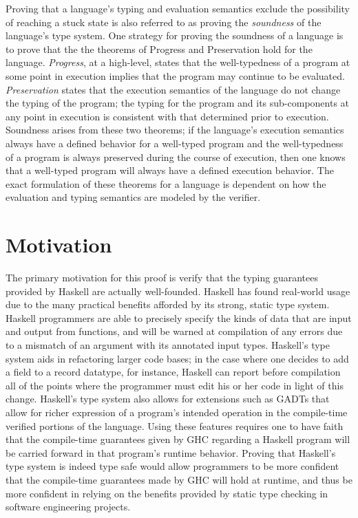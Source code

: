\documentclass{sig-alternate}
\begin{document}
Proving that a language's typing and evaluation semantics exclude the possibility of reaching a stuck state is also referred to as proving the {\em soundness} of the language's type system. One strategy for proving the soundness of a language is to prove that the the theorems of Progress and Preservation hold for the language. {\em Progress}, at a high-level, states that the well-typedness of a program at some point in execution implies that the program may continue to be evaluated. {\em Preservation} states that the execution semantics of the language do not change the typing of the program; the typing for the program and its sub-components at any point in execution is consistent with that determined prior to execution. Soundness arises from these two theorems; if the language's execution semantics always have a defined behavior for a well-typed program and the well-typedness of a program is always preserved during the course of execution, then one knows that a well-typed program will always have a defined execution behavior. The exact formulation of these theorems for a language is dependent on how the evaluation and typing semantics are modeled by the verifier.


\section{Motivation}
\label{sec:motivation}

The primary motivation for this proof is verify that the typing guarantees provided by Haskell are actually well-founded. Haskell has found real-world usage due to the many practical benefits afforded by its strong, static type system. Haskell programmers are able to precisely specify the kinds of data that are input and output from functions, and will be warned at compilation of any errors due to a mismatch of an argument with its annotated input types. Haskell's type system aids in refactoring larger code bases; in the case where one decides to add a field to a record datatype, for instance, Haskell can report before compilation all of the points where the programmer must edit his or her code in light of this change. Haskell's type system also allows for extensions such as GADTs that allow for richer expression of a program's intended operation in the compile-time verified portions of the language. Using these features requires one to have faith that the compile-time guarantees given by GHC regarding a Haskell program will be carried forward in that program's runtime behavior. Proving that Haskell's type system is indeed type safe would allow programmers to be more confident that the compile-time guarantees made by GHC will hold at runtime, and thus be more confident in relying on the benefits provided by static type checking in software engineering projects.
\end{document}
